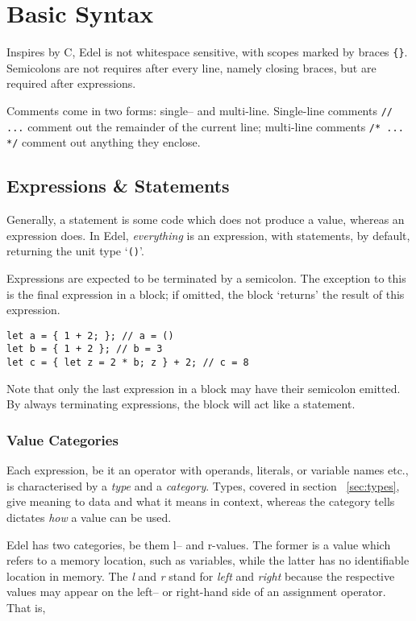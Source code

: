 \section{Basic Syntax}\label{sec:basic-syntax}

Inspires by C, Edel is not whitespace sensitive, with scopes marked by braces \texttt{\{\}}.
Semicolons are not requires after every line, namely closing braces, but are required after expressions.

Comments come in two forms: single-- and multi-line.
Single-line comments \texttt{// ...} comment out the remainder of the current line;
multi-line comments \texttt{/* ... */} comment out anything they enclose.

\subsection{Expressions \& Statements}\label{subsec:expressions-&-statements}

Generally, a statement is some code which does not produce a value, whereas an expression does.
In Edel, \textit{everything} is an expression, with statements, by default, returning the unit type `\texttt{()}'.

Expressions are expected to be terminated by a semicolon.
The exception to this is the final expression in a block; if omitted, the block `returns' the result of this expression.

\begin{lstlisting}[language=CustomLang]
let a = { 1 + 2; }; // a = ()
let b = { 1 + 2 }; // b = 3
let c = { let z = 2 * b; z } + 2; // c = 8
\end{lstlisting}

Note that only the last expression in a block may have their semicolon emitted.
By always terminating expressions, the block will act like a statement.

\subsubsection{Value Categories}

Each expression, be it an operator with operands, literals, or variable names etc., is characterised by a \textit{type} and a \textit{category}.
Types, covered in section ~\ref{sec:types}, give meaning to data and what it means in context, whereas the category tells dictates \textit{how} a value can be used.

Edel has two categories, be them l-- and r-values.
The former is a value which refers to a memory location, such as variables, while the latter has no identifiable location in memory.
The \textit{l} and \textit{r} stand for \textit{left} and \textit{right} because the respective values may appear on the left-- or right-hand side of an assignment operator.
That is,

